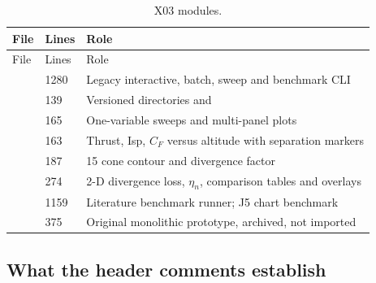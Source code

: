 \begingroup\chtenTables
\begin{longtable}{@{}P{5.2cm}P{0.8cm}P{10.4cm}@{}}
\caption{X03 modules.}\label{tab:x03-modules}\\
\toprule File & Lines & Role \\ \midrule\endfirsthead
\toprule File & Lines & Role \\ \midrule\endhead
{} & 1280 & Legacy interactive, batch, sweep and benchmark CLI \\
 & 139 & Versioned  directories and  \\
 & 165 & One-variable sweeps and multi-panel plots \\
 & 163 & Thrust, Isp, $C_F$ versus altitude with separation markers \\
 & 187 & 15\textdegree{} cone contour and divergence factor \\
 & 274 & 2-D divergence loss, $\eta_n$, comparison tables and overlays \\
 & 1159 & Literature benchmark runner; J5 chart benchmark \\
 & 375 & Original monolithic prototype, archived, not imported \\
\bottomrule
\end{longtable}
\endgroup

\subsection{What the header comments establish}

